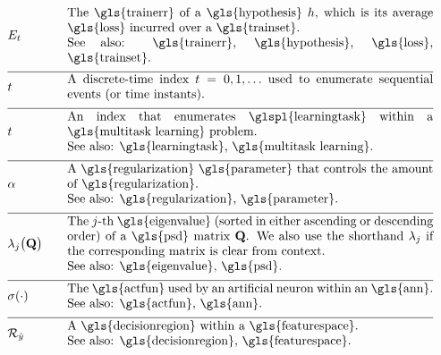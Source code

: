 \begin{align}                          
	&\trainerror &\quad &\parbox{.85\textwidth}{The \gls{trainerr} of a \gls{hypothesis} $\hypothesis$, which is its 
		average \gls{loss} incurred over a \gls{trainset}.
		\\ See also: \gls{trainerr}, \gls{hypothesis}, \gls{loss}, \gls{trainset}. }\nonumber \\[2mm] \hline \nonumber\\[-5mm]
	&\timeidx &\quad &\parbox{.85\textwidth}{A discrete-time index $\timeidx=0, 1, \ldots$ used to 
		enumerate sequential events (or time instants). }\nonumber \\[2mm] \hline \nonumber\\[-5mm]
	&\taskidx &\quad &\parbox{.85\textwidth}{An index that enumerates
		\glspl{learningtask} within a \gls{multitask learning} problem.
		\\ See also: \gls{learningtask}, \gls{multitask learning}. }\nonumber \\[2mm] \hline \nonumber\\[-5mm]
	&\regparam &\quad &\parbox{.85\textwidth}{A \gls{regularization} \gls{parameter} that controls 
		the amount of \gls{regularization}.
		\\ See also: \gls{regularization}, \gls{parameter}. } \nonumber \\[2mm] \hline \nonumber\\[-5mm]
	&\eigval{\featureidx}\big( \mathbf{Q} \big) &\quad &\parbox{.85\textwidth}{The $\featureidx$-th 
		\gls{eigenvalue} (sorted in either ascending or descending order) of a \gls{psd} matrix $\mathbf{Q}$. We also 
		use the shorthand $\eigval{\featureidx}$ if the corresponding matrix is clear from context.
		\\ See also: \gls{eigenvalue}, \gls{psd}. }\nonumber \\[2mm] \hline \nonumber\\[-5mm]
	&\actfun(\cdot) &\quad &\parbox{.85\textwidth}{The \gls{actfun} used by an artificial neuron within an \gls{ann}.
		\\ See also: \gls{actfun}, \gls{ann}. }\nonumber \\[2mm] \hline \nonumber\\[-5mm]
	&\decreg{\hat{\truelabel}} &\quad &\parbox{.85\textwidth}{A \gls{decisionregion} within a \gls{featurespace}.
		\\ See also: \gls{decisionregion}, \gls{featurespace}. }\nonumber
\end{align}     

